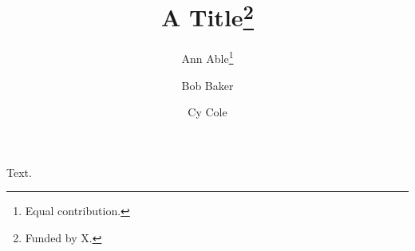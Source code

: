 \documentclass{article}
\title{A Title\thanks{Funded by X.}}
\author{Ann Able\thanks{Equal contribution.} \and Bob Baker\footnotemark[2] \and Cy Cole\footnotemark[1]}
\date{}
\begin{document}
\maketitle
Text.
\end{document}
